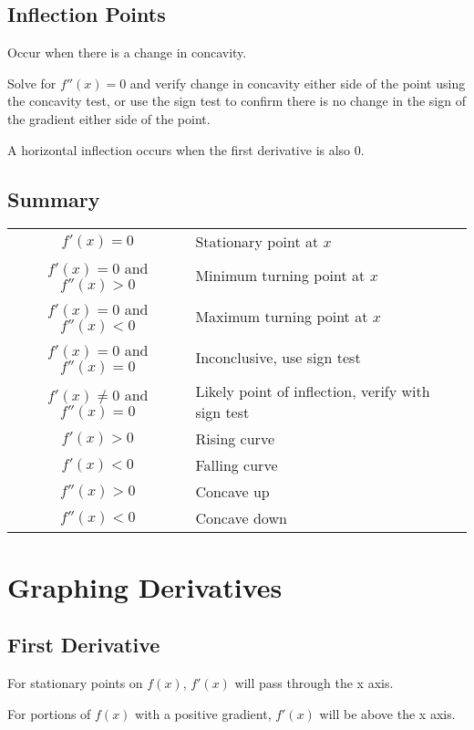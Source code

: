 \documentclass[a4paper,11pt]{article}
\begin{document}
\subsection{Inflection Points}

Occur when there is a change in concavity.

Solve for $f''(x) = 0$ and verify change in concavity either side of the point
using the concavity test, or use the sign test to confirm there is no change
in the sign of the gradient either side of the point.

A horizontal inflection occurs when the first derivative is also 0.


\subsection{Summary}

\begin{center}
\begin{tabular}{cl}
$f'(x) = 0$ & Stationary point at $x$ \\
$f'(x) = 0$ and $f''(x) > 0$ & Minimum turning point at $x$ \\
$f'(x) = 0$ and $f''(x) < 0$ & Maximum turning point at $x$ \\
$f'(x) = 0$ and $f''(x) = 0$ & Inconclusive, use sign test \\
$f'(x) \neq 0$ and $f''(x) = 0$ & Likely point of inflection, verify with sign test \\
$f'(x) > 0$ & Rising curve \\
$f'(x) < 0$ & Falling curve \\
$f''(x) > 0$ & Concave up \\
$f''(x) < 0$ & Concave down \\
\end{tabular}
\end{center}




\section{Graphing Derivatives}

\subsection{First Derivative}

For stationary points on $f(x)$, $f'(x)$ will pass through the x axis.

For portions of $f(x)$ with a positive gradient, $f'(x)$ will be above the x
axis.
\end{document}
